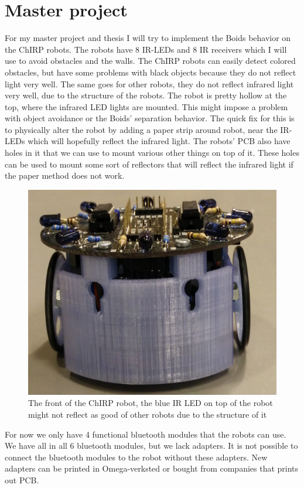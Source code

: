 \section{Master project}
For my master project and thesis I will try to implement the Boids behavior on the ChIRP robots. The robots have 8 IR-LEDs and 8 IR receivers which I will use to avoid obstacles and the walls. The ChIRP robots can easily detect colored obstacles, but have some problems with black objects because they do not reflect light very well. The same goes for other robots, they do not reflect infrared light very well, due to the structure of the robots. The robot is pretty hollow at the top, where the infrared LED lights are mounted. This might impose a problem with object avoidance or the Boids' separation behavior. The quick fix for this is to physically alter the robot by adding a paper strip around robot, near the IR-LEDs which will hopefully reflect the infrared light.
The robots' PCB also have holes in it that we can use to mount various other things on top of it. These holes can be used to mount some sort of reflectors that will reflect the infrared light if the paper method does not work.
\begin{figure}[H]
\centering
\includegraphics[width=0.8\linewidth]{images/chirpFront.jpg}
\caption[Front of ChIRP robot]{The front of the ChIRP robot, the blue IR LED on top of the robot might not reflect as good of other robots due to the structure of it}
\label{fig:chirpsFront}
\end{figure}
For now we only have 4 functional bluetooth modules that the robots can use. We have all in all 6 bluetooth modules, but we lack adapters. It is not possible to connect the bluetooth modules to the robot without these adapters. New adapters can be printed in Omega-verksted or bought from companies that prints out PCB.

